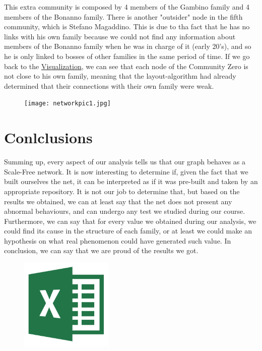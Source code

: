 \documentclass{article}
\begin{document}
\noindent
This extra community is composed by 4 members of the Gambino family and 4 members of the Bonanno family. There is another "outsider" node in the fifth community, which is Stefano Magaddino. This is due to tha fact that he has no links with his own family because we could not find any information about members of the Bonanno family when he was in charge of it (early 20's), and so he is only linked to bosses of other families in the same period of time. If we go back to the \hyperref[sec:Visualization]{Visualization}, we can see that each node of the Community Zero is not close to his own family, meaning that the layout-algorithm had already determined that their connections with their own family were weak.
\newpage



\begin{figure}[t!]
\vspace{-250pt}
\centering
\texttt{[image: networkpic1.jpg]}
\advance\leftskip-3.52cm
\end{figure}



\pagecolor{Pagine}
\section{\textcolor{Paragrafi}{Conlclusions}}
Summing up, every aspect of our analysis tells us that our graph behaves as a Scale-Free network. It is now interesting to determine if, given the fact that we built ourselves the net, it can be interpreted as if it was pre-built and taken by an appropriate repository. It is not our job to determine that, but based on the results we obtained, we can at least say that the net does not present any abnormal behaviours, and can undergo any test we studied during our course. Furthermore, we can say that for every value we obtained during our analysis, we could find its cause in the structure of each family, or at least we could make an hypothesis on what real phenomenon could have generated such value. In conclusion, we can say that we are proud of the results we got.



\begin{figure}[h!]
\vspace{50pt}
\begin{flushright}
\includegraphics[width=125pt]{excel.png}
\end{flushright}
\end{figure}
\end{document}

